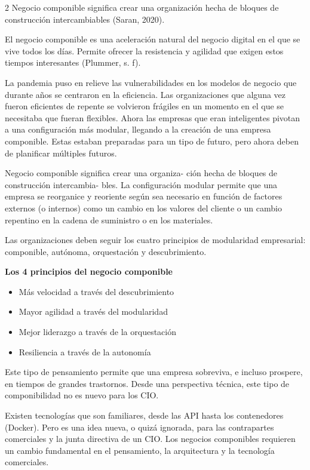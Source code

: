 \documentclass[12pt,spanish,Letterpaper,openany]{book}
\providecommand{\tightlist}{%
  \setlength{\itemsep}{0pt}\setlength{\parskip}{0pt}}
\begin{document}
\begin {multicols}{2}
Negocio componible significa crear una organización hecha de bloques de construcción intercambiables (Saran, 2020).

El negocio componible es una aceleración natural del negocio digital en el que se vive todos los días. Permite ofrecer la resistencia y agilidad que exigen estos tiempos interesantes (Plummer, s. f).

La pandemia puso en relieve las vulnerabilidades en los modelos de negocio que durante años se centraron en la eficiencia. Las organizaciones que alguna vez fueron eficientes de repente se volvieron frágiles en un momento en el que se necesitaba que fueran flexibles. Ahora las empresas que eran inteligentes pivotan a una configuración más modular, llegando a la creación de una empresa componible. Estas estaban preparadas para un tipo de futuro, pero ahora deben de planificar múltiples futuros.

Negocio componible significa crear una organiza-
ción hecha de bloques de construcción intercambia-
bles. La configuración modular permite que una empresa se reorganice y reoriente según sea necesario en función de factores externos (o internos) como un cambio en los valores del cliente o un cambio repentino en la cadena de suministro o en los materiales.

Las organizaciones deben seguir los cuatro principios de modularidad empresarial: componible, autónoma, orquestación y descubrimiento.

\textbf{Los 4 principios del negocio componible}

\begin{itemize}
\tightlist
\item
  Más velocidad a través del descubrimiento
\item
  Mayor agilidad a través del modularidad
\item
  Mejor liderazgo a través de la orquestación
\item
  Resiliencia a través de la autonomía
\end{itemize}

Este tipo de pensamiento permite que una empresa sobreviva, e incluso prospere, en tiempos de grandes trastornos. Desde una perspectiva técnica, este tipo de componibilidad no es nuevo para los CIO.

Existen tecnologías que son familiares, desde las API hasta los contenedores (Docker). Pero es una idea nueva, o quizá ignorada, para las contrapartes comerciales y la junta directiva de un CIO. Los negocios componibles requieren un cambio fundamental en el pensamiento, la arquitectura y la tecnología comerciales.


\end{multicols}
\end{document}
